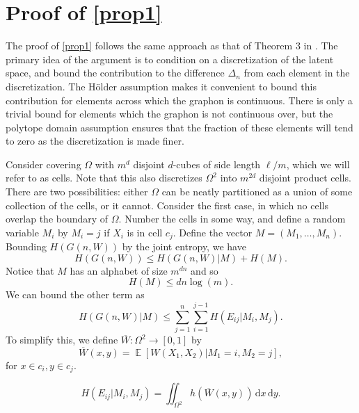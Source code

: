 \documentclass{svproc}
\DeclareMathOperator{\E}{\mathbb{E}}
\newcommand{\1}{\mathbbm{1}}
\newcommand{\K}{\Omega}
\newcommand{\ol}[1]{\overline{#1}}
\newcommand{\dd}{\,\mathrm{d}}
\begin{document}

\appendix
\section{Proof of \cref{prop1}}\label{app1}

The proof of \cref{prop1} follows the same approach as that of Theorem 3 in \cite{bakerpaper}. The primary idea of the argument is to condition on a discretization of the latent space, and bound the contribution to the difference $\Delta_n$ from each element in the discretization. The H\"{o}lder assumption makes it convenient to bound this contribution for elements across which the graphon is continuous. There is only a trivial bound for elements which the graphon is not continuous over, but the polytope domain assumption ensures that the fraction of these elements will tend to zero as the discretization is made finer.

Consider covering $\K$ with $m^d$ disjoint $d$-cubes of side length $\ell/m$, which we will refer to as cells. Note that this also discretizes $\K^2$ into $m^{2d}$ disjoint product cells. There are two possibilities: either $\K$ can be neatly partitioned as a union of some collection of the cells, or it cannot. Consider the first case, in which no cells overlap the boundary of $\K$. Number the cells in some way, and define a random variable $M_i$ by $M_i = j$ if $X_i$ is in cell $c_j$. Define the vector $M = (M_1,\dots,M_n)$. Bounding $H(G(n,W))$ by the joint entropy, we have
\begin{equation}
H(G(n,W))\leq H(G(n,W)|M)+H(M).\end{equation}
Notice that $M$ has an alphabet of size $m^{dn}$ and so
\begin{equation}H(M)\leq dn\log(m).\end{equation}
We can bound the other term as
\begin{equation}\label{upbnd}
H(G(n,W)|M)\leq\sum_{j=1}^n\sum_{i=1}^{j-1} H(E_{ij}|M_i,M_j).
\end{equation}
To simplify this, we define $\ol{W}:\K^2\to [0,1]$ by
\begin{equation}
\ol{W}(x,y) = \E[W(X_1,X_2)|M_1 = i, M_2=j],
\end{equation}
for $x\in c_i, y\in c_j$. 

\begin{lemma}\label{olw}
\[H(E_{ij}|M_i,M_j) = \iint_{\K^2}h(\ol{W}(x,y))\dd x\dd y.\]
\end{lemma}
\end{document}
